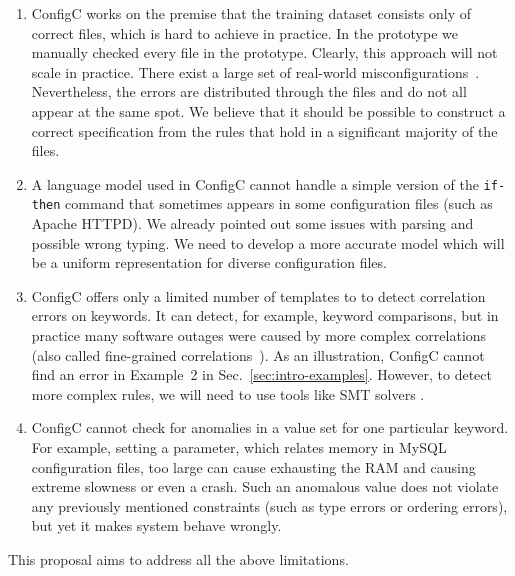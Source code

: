 \begin{enumerate}

\item ConfigC works on the premise that the training dataset consists 
only of correct files, which is hard to achieve in practice. In the 
prototype we manually checked every file in the prototype. Clearly, this 
approach will not scale in practice. There exist a large set of 
real-world misconfigurations~\cite{configdataset}. Nevertheless, the 
errors are distributed through the files and do not all appear at the 
same spot. We believe that it should be possible to construct a correct
specification from the rules that hold in a significant majority of the 
files.

\item A language model used in ConfigC cannot handle a simple version of 
the {\tt {if-then}} command that sometimes appears in some configuration
files (such as Apache HTTPD). We already pointed out some issues with 
parsing and possible wrong typing. We need to develop a more 
accurate model which will be a uniform representation for diverse
  configuration files.

\item ConfigC offers only a limited number of templates to to detect 
correlation errors on keywords. It can detect, for example, 
keyword comparisons, but in practice many software outages were 
caused by more complex correlations (also called
  fine-grained correlations~\cite{correlation}). As an illustration,
  ConfigC cannot find an error in Example~2 in 
Sec.~\ref{sec:intro-examples}. However, to detect more complex rules, we will need to use tools like SMT solvers \cite{z3, cvc4}.


\item ConfigC cannot check for anomalies in a value set for one particular keyword. For example,
  setting a parameter, which relates memory in MySQL configuration 
  files, too large can cause exhausting the RAM and causing extreme 
  slowness or even a crash. Such an anomalous value does not violate any
  previously mentioned constraints (such as type errors or ordering errors), but yet 
  it makes system behave wrongly.

\end{enumerate}

This proposal aims to address all the above limitations. 
